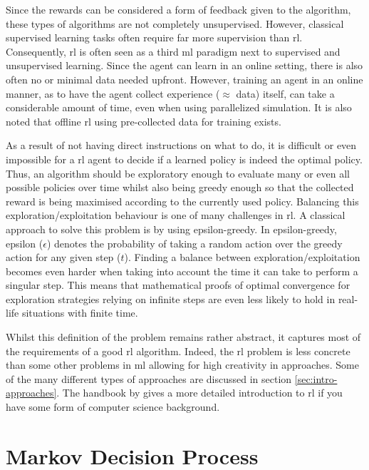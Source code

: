 Since the rewards can be considered a form of feedback given to the algorithm, these types of algorithms are not completely unsupervised.
However, classical supervised learning tasks often require far more supervision than \gls{rl}.
Consequently, \gls{rl} is often seen as a third \gls{ml} paradigm next to supervised and unsupervised learning.
Since the agent can learn in an online setting, there is also often no or minimal data needed upfront.
However, training an agent in an online manner, as to have the agent collect experience ($\approx$ data) itself, can take a considerable amount of time, even when using parallelized simulation.
It is also noted that offline \gls{rl} using pre-collected data for training exists.


As a result of not having direct instructions on what to do, it is difficult or even impossible for a \gls{rl} agent to decide if a learned policy is indeed the optimal policy.
Thus, an algorithm should be exploratory enough to evaluate many or even all possible policies over time whilst also being greedy enough so that the collected reward is being maximised according to the currently used policy.
Balancing this exploration/exploitation behaviour is one of many challenges in \gls{rl}.
A classical approach to solve this problem is by using epsilon-greedy.
In epsilon-greedy, epsilon ($\epsilon$) denotes the probability of taking a random action over the greedy action for any given step ($t$).
Finding a balance between exploration/exploitation becomes even harder when taking into account the time it can take to perform a singular step.
This means that mathematical proofs of optimal convergence for exploration strategies relying on infinite steps are even less likely to hold in real-life situations with finite time.

Whilst this definition of the  problem remains rather abstract, it captures most of the requirements of a good \gls{rl} algorithm.
Indeed, the \gls{rl} problem is less concrete than some other problems in \gls{ml} allowing for high creativity in approaches.
Some of the many different types of approaches are discussed in section \ref{sec:intro-approaches}.
The handbook by \citet{rl_intro_handbook} gives a more detailed introduction to \gls{rl} if you have some form of computer science background.



\section{Markov Decision Process}
\label{sec:intro-mdp}


